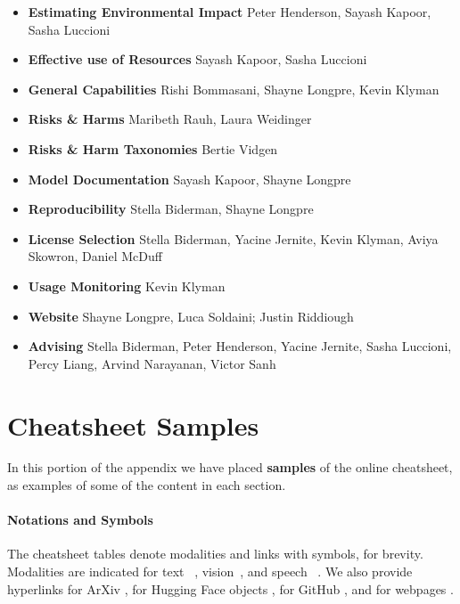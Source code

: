 \begin{itemize}
    \item \textbf{Estimating Environmental Impact} \; Peter Henderson, Sayash Kapoor, Sasha Luccioni
    \item \textbf{Effective use of Resources} \; Sayash Kapoor, Sasha Luccioni
    \item \textbf{General Capabilities} \; Rishi Bommasani, Shayne Longpre, Kevin Klyman
    \item \textbf{Risks \& Harms} \;  Maribeth Rauh, Laura Weidinger
    \item \textbf{Risks \& Harm Taxonomies} \;  Bertie Vidgen
    \item \textbf{Model Documentation} \; Sayash Kapoor, Shayne Longpre
    \item \textbf{Reproducibility} \; Stella Biderman, Shayne Longpre
    \item \textbf{License Selection} \; Stella Biderman, Yacine Jernite, Kevin Klyman, Aviya Skowron, Daniel McDuff
    \item \textbf{Usage Monitoring} \; Kevin Klyman
    \vspace{3mm}
    \item \textbf{Website} \; Shayne Longpre, Luca Soldaini; Justin Riddiough
    \item \textbf{Advising} \; Stella Biderman, Peter Henderson, Yacine Jernite, Sasha Luccioni, Percy Liang, Arvind Narayanan, Victor Sanh
\end{itemize}

\section{Cheatsheet Samples}

In this portion of the appendix we have placed \textbf{samples} of the online cheatsheet, as examples of some of the content in each section.

\paragraph{Notations and Symbols}
The cheatsheet tables denote modalities and links with symbols, for brevity.
Modalities are indicated for text ~\TextCircle[0.75]{}, vision~\VisionCircle[0.75]{}, and speech ~\SpeechCircle[0.75].
We also provide hyperlinks for ArXiv \earxiv[1.2em][-0.4ex]\hspace{0.25em}, for Hugging Face objects \ehf[1.2em][-0.4ex]\hspace{0.25em}, for GitHub \egithub[1.2em][-0.4ex]\hspace{0.25em}, and for webpages \eweb[1.2em][-0.4ex]\hspace{0.25em}.


